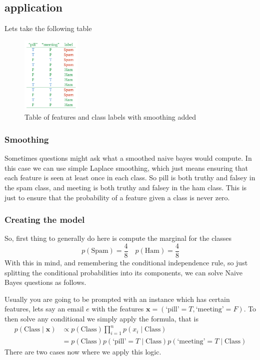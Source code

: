 \documentclass[12pt]{article}
\begin{document}
\subsection{application} 
Lets take the following table
\begin{figure}[!h]
    \centering
    \includegraphics[width=0.25\textwidth]{assets/hb1.png}
    \caption{Table of features and class labels with smoothing added}
\end{figure}

\subsubsection*{Smoothing}

Sometimes questions might ask what a smoothed naive bayes would compute. In this case we can use simple Laplace smoothing, which just means ensuring that each feature is seen at least once in each class. So pill is both truthy and falsey in the spam class, and meeting is both truthy and falsey in the ham class. This is just to ensure that the probability of a feature given a class is never zero.

\subsubsection*{Creating the model}

So, first thing to generally do here is compute the marginal for the classes 
\[
    p(\text{Spam}) = \frac{4}{8} \quad p(\text{Ham}) = \frac{4}{8}    
\]
With this in mind, and remembering the conditional independence rule, so just splitting the conditional probabilities into its components, we can solve Naive Bayes questions as follows. 

\smallskip
Usually you are going to be prompted with an instance which has certain features, lets say an email $e$ with the features $\mathbf x = (\text{`pill'} = T, \text{`meeting'} = F)$. To then solve any conditional we simply apply the formula, that is 
\begin{align*}
    p(\text{Class} \mid \mathbf x) &\propto p(\text{Class})\prod_{i=1}^{n}p(x_i\mid \text{Class}) \\
    &= p(\text{Class})p(\text{`pill'} = T \mid \text{Class})p(\text{`meeting'} = T \mid \text{Class}) 
\end{align*}
There are two cases now where we apply this logic. 
\end{document}
